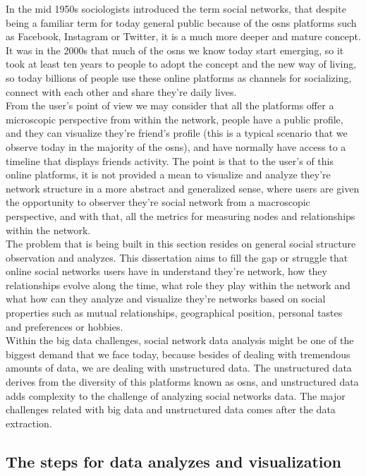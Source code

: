 In the mid 1950s sociologists introduced the term social networks, that despite being a familiar term for today general public because of the \glspl{osn} platforms such as Facebook, Instagram or Twitter, it is a much more deeper and mature concept. It was in the 2000s that much of the \glspl{osn} we know today start emerging, so it took at least ten years to people to adopt the concept and the new way of living, so today billions of people use these online platforms as channels for socializing, connect with each other and share they're daily lives.\\
\indent From the user's point of view we may consider that all the platforms offer a microscopic perspective from within the network, people have a public profile, and they can visualize they're friend's profile (this is a typical scenario that we observe today in the majority of the \glspl{osn}), and have normally have access to a timeline that displays friends activity. The point is that to the user's of this online platforms, it is not provided a mean to visualize and analyze they're network structure in a more abstract and generalized sense, where users are given the opportunity to observer they're social network from a macroscopic perspective, and with that, all the metrics for measuring nodes and relationships within the network.\\
\indent The problem that is being built in this section resides on general social structure observation and analyzes. This dissertation aims to fill the gap or struggle that online social networks users have in understand they're network, how they relationships evolve along the time, what role they play within the network and what how can they analyze and visualize they're networks based on social properties such as mutual relationships, geographical position, personal tastes and preferences or hobbies.\\
\indent Within the big data challenges, social network data analysis might be one of the biggest demand that we face today, because besides of dealing with tremendous amounts of data, we are dealing with unstructured data. The unstructured data derives from the diversity of this platforms known as \glspl{osn}, and unstructured data adds complexity to the challenge of analyzing social networks data. The major challenges related with big data and unstructured data comes after the data extraction.

\subsection*{The steps for data analyzes and visualization}

